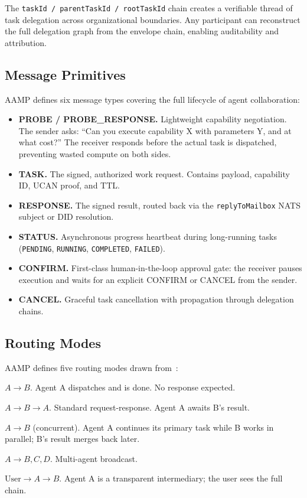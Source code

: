 \documentclass[11pt,a4paper]{article}
\begin{document}
The \texttt{taskId / parentTaskId / rootTaskId} chain creates a verifiable thread of
task delegation across organizational boundaries. Any participant can reconstruct the
full delegation graph from the envelope chain, enabling auditability and attribution.

\subsection{Message Primitives}
\label{sec:primitives}

AAMP defines six message types covering the full lifecycle of agent collaboration:

\begin{itemize}[leftmargin=*]
  \item \textbf{PROBE / PROBE\_RESPONSE.} Lightweight capability negotiation. The
    sender asks: ``Can you execute capability X with parameters Y, and at what cost?''
    The receiver responds before the actual task is dispatched, preventing wasted
    compute on both sides.
  \item \textbf{TASK.} The signed, authorized work request. Contains payload,
    capability ID, UCAN proof, and TTL.
  \item \textbf{RESPONSE.} The signed result, routed back via the
    \texttt{replyToMailbox} NATS subject or DID resolution.
  \item \textbf{STATUS.} Asynchronous progress heartbeat during long-running tasks
    (\texttt{PENDING}, \texttt{RUNNING}, \texttt{COMPLETED}, \texttt{FAILED}).
  \item \textbf{CONFIRM.} First-class human-in-the-loop approval gate: the receiver
    pauses execution and waits for an explicit CONFIRM or CANCEL from the sender.
  \item \textbf{CANCEL.} Graceful task cancellation with propagation through
    delegation chains.
\end{itemize}

\subsection{Routing Modes}
\label{sec:routing}

AAMP defines five routing modes drawn from~\citet{rosenberg2024}:

\begin{description}[leftmargin=3.4cm,style=nextline]
  \item[\texttt{BLIND\_TRANSFER}] $A \to B$. Agent A dispatches and is done.
    No response expected.
  \item[\texttt{SUPERVISED\_TRANSFER}] $A \to B \to A$. Standard request-response.
    Agent A awaits B's result.
  \item[\texttt{SIDEBAR}] $A \to B$ (concurrent). Agent A continues its primary task
    while B works in parallel; B's result merges back later.
  \item[\texttt{CONFERENCE}] $A \to B, C, D$. Multi-agent broadcast.
  \item[\texttt{PASSTHROUGH}] $\text{User} \to A \to B$. Agent A is a transparent
    intermediary; the user sees the full chain.
\end{description}
\end{document}
